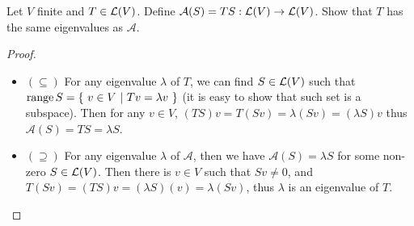 \documentclass[../main.tex]{subfiles}
\begin{document}
\setcounter{exercise}{36}
\begin{exercise}
  Let $V$ finite and $T \in \mathcal{L}(V)$. Define $\mathcal{A}(S) = TS : \mathcal{L}(V) \rightarrow \mathcal{L}(V)$.
  Show that $T$ has the same eigenvalues as $\mathcal{A}$.
\end{exercise}
\begin{proof}
  ~
  \begin{itemize}
    \item $(\subseteq)$ For any eigenvalue $\lambda$ of $T$, we can find $S \in \mathcal{L}(V)$
          such that $\operatorname{range} S = \{ \ v \in V \ | \ Tv = \lambda v \ \}$ (it is easy to show that
          such set is a subspace).
          Then for any $v \in V$, $(TS)v = T(Sv) = \lambda (Sv) = (\lambda S) v$
          thus $\mathcal{A}(S) = TS = \lambda S$.
    \item $(\supseteq)$ For any eigenvalue $\lambda$ of $\mathcal{A}$,
          then we have $\mathcal{A}(S) = \lambda S$ for some non-zero $S \in \mathcal{L}(V)$.
          Then there is $v \in V$ such that $Sv \neq 0$, and $T(Sv) = (TS)v = (\lambda S)(v) = \lambda (Sv)$,
          thus $\lambda$ is an eigenvalue of $T$.
  \end{itemize}
\end{proof}
\end{document}
